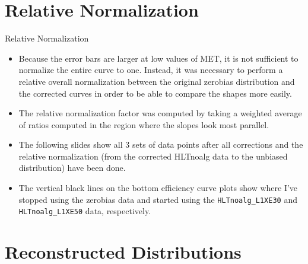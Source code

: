\documentclass[draft]{beamer}
\begin{document}
\section{Relative Normalization}
\begin{frame}{Relative Normalization}
		\begin{itemize}
				\item Because the error bars are larger at low values of MET, it is not sufficient to normalize the entire curve to one. Instead, it was necessary to perform a relative overall normalization between the original zerobias distribution and the corrected curves in order to be able to compare the shapes more easily.
				\item The relative normalization factor was computed by taking a weighted average of ratios computed in the region where the slopes look most parallel.
                \item The following slides show all 3 sets of data points after all corrections and the relative normalization (from the corrected HLTnoalg data to the unbiased distribution) have been done.
                \item The vertical black lines on the bottom efficiency curve plots show where I've stopped using the zerobias data and started using the \texttt{HLTnoalg\_L1XE30} and \texttt{HLTnoalg\_L1XE50} data, respectively.
		\end{itemize}
\end{frame}
\section{Reconstructed Distributions}
\begin{frame}
\end{frame}
\end{document}
